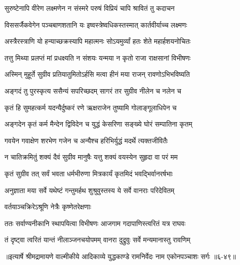 \twolineshloka
{सुरुष्टेनापि वीरेण लक्ष्मणेन न संस्मरे}
{परुषं विप्रियं चापि श्रावितं तु कदाचन} %

\twolineshloka
{विससर्जैकवेगेन पञ्चबाणशतानि यः}
{इष्वस्त्रेष्वधिकस्तस्मात् कार्तवीर्याच्च लक्ष्मणः} %

\twolineshloka
{अस्त्रैरस्त्राणि यो हन्याच्छक्रस्यापि महात्मनः}
{सोऽयमुर्व्यां हतः शेते महार्हशयनोचितः} %

\twolineshloka
{तत्तु मिथ्या प्रलप्तं मां प्रधक्ष्यति न संशयः}
{यन्मया न कृतो राजा राक्षसानां विभीषणः} %

\twolineshloka
{अस्मिन् मुहूर्ते सुग्रीव प्रतियातुमितोऽर्हसि}
{मत्वा हीनं मया राजन् रावणोऽभिभविष्यति} %

\twolineshloka
{अङ्गदं तु पुरस्कृत्य ससैन्यं सपरिच्छदम्}
{सागरं तर सुग्रीव नीलेन च नलेन च} %

\twolineshloka
{कृतं हि सुमहत्कर्म यदन्यैर्दुष्करं रणे}
{ऋक्षराजेन तुष्यामि गोलाङ्गूलाधिपेन च} %

\twolineshloka
{अङ्गदेन कृतं कर्म मैन्देन द्विविदेन च}
{युद्धं केसरिणा सङ्ख्ये घोरं सम्पातिना कृतम्} %

\twolineshloka
{गवयेन गवाक्षेण शरभेण गजेन च}
{अन्यैश्च हरिभिर्युद्धं मदर्थे त्यक्तजीवितैः} %

\twolineshloka
{न चातिक्रमितुं शक्यं दैवं सुग्रीव मानुषैः}
{यत्तु शक्यं वयस्येन सुहृदा वा परं मम} %

\twolineshloka
{कृतं सुग्रीव तत् सर्वं भवता धर्मभीरुणा}
{मित्रकार्यं कृतमिदं भवद्भिर्वानरर्षभाः} %

\twolineshloka
{अनुज्ञाता मया सर्वे यथेष्टं गन्तुमर्हथ}
{शुश्रुवुस्तस्य ये सर्वे वानराः परिदेवितम्} %

\onelineshloka
{वर्तयाञ्चक्रिरेऽश्रूणि नेत्रैः कृष्णेतरेक्षणाः} %

\twolineshloka
{ततः सर्वाण्यनीकानि स्थापयित्वा विभीषणः}
{आजगाम गदापाणिस्त्वरितं यत्र राघवः} %

\twolineshloka
{तं दृष्ट्वा त्वरितं यान्तं नीलाञ्जनचयोपमम्}
{वानरा दुद्रुवुः सर्वे मन्यमानास्तु रावणिम्} %


॥इत्यार्षे श्रीमद्रामायणे वाल्मीकीये आदिकाव्ये युद्धकाण्डे रामनिर्वेदः नाम एकोनपञ्चाशः सर्गः ॥६-४९॥
